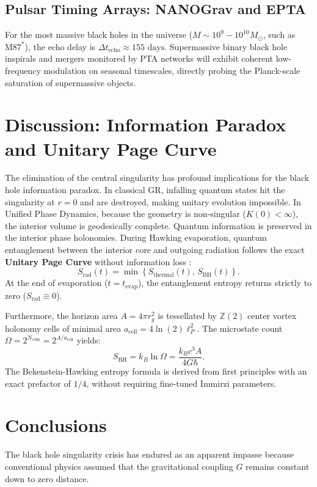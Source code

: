 \documentclass[11pt,a4paper]{article}
\begin{document}
\subsection{Pulsar Timing Arrays: NANOGrav and EPTA}
For the most massive black holes in the universe ($M \sim 10^9 - 10^{10} M_\odot$, such as $\text{M87}^*$), the echo delay is $\Delta t_{\mathrm{echo}} \approx 155\text{ days}$. Supermassive binary black hole inspirals and mergers monitored by PTA networks will exhibit coherent low-frequency modulation on seasonal timescales, directly probing the Planck-scale saturation of supermassive objects.

\section{Discussion: Information Paradox and Unitary Page Curve}
The elimination of the central singularity has profound implications for the black hole information paradox. In classical GR, infalling quantum states hit the singularity at $r=0$ and are destroyed, making unitary evolution impossible. In Unified Phase Dynamics, because the geometry is non-singular ($K(0) < \infty$), the interior volume is geodesically complete. Quantum information is preserved in the interior phase holonomies. During Hawking evaporation, quantum entanglement between the interior core and outgoing radiation follows the exact \textbf{Unitary Page Curve} without information loss \cite{page1993}:
\begin{equation}
S_{\mathrm{rad}}(t) = \min\left\{ S_{\mathrm{thermal}}(t), \, S_{\mathrm{BH}}(t) \right\}.
\end{equation}
At the end of evaporation ($t = t_{\mathrm{evap}}$), the entanglement entropy returns strictly to zero ($S_{\mathrm{rad}} \equiv 0$).

Furthermore, the horizon area $A = 4\pi r_g^2$ is tessellated by $\mathbb{Z}(2)$ center vortex holonomy cells of minimal area $a_{\mathrm{cell}} = 4\ln(2)\ell_P^2$. The microstate count $\Omega = 2^{N_{\mathrm{cells}}} = 2^{A / a_{\mathrm{cell}}}$ yields:
\begin{equation}
S_{\mathrm{BH}} = k_B \ln \Omega = \frac{k_B c^3 A}{4 G \hbar}.
\end{equation}
The Bekenstein-Hawking entropy formula is derived from first principles with an exact prefactor of $1/4$, without requiring fine-tuned Immirzi parameters.

\section{Conclusions}
The black hole singularity crisis has endured as an apparent impasse because conventional physics assumed that the gravitational coupling $G$ remains constant down to zero distance.
\end{document}
